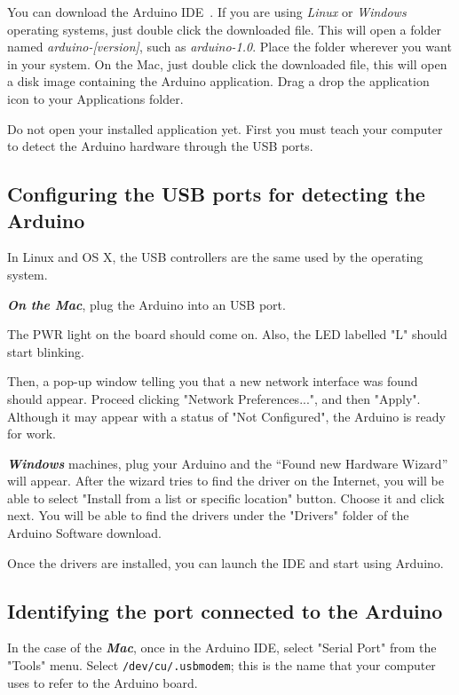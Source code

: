 You can download the Arduino IDE~\emph{}. If you are using \emph{Linux} or \emph{Windows} operating systems, just double click the downloaded file. This will open a folder named \emph{arduino-[version]}, such as \emph{arduino-1.0}. Place the folder wherever you want in your system. On the Mac, just double click the downloaded file, this will open a disk image containing the Arduino application. Drag a drop the application icon to your Applications folder.

Do not open your installed application yet. First you must teach your computer to detect the Arduino hardware through the USB ports.

\subsection{Configuring the USB ports for detecting the Arduino}
In Linux and OS X, the USB controllers are the same used by the operating system.

\emph{\bf{On the Mac}}, plug the Arduino into an USB port.

The PWR light on the board should come on. Also, the LED labelled "L" should start blinking.

Then, a pop-up window telling you that a new network interface was found should appear. Proceed clicking "Network Preferences...", and then "Apply". Although it may appear with a status of "Not Configured", the Arduino is ready for work.

\emph{\bf{Windows}} machines, plug your Arduino and the ``Found new Hardware Wizard'' will appear. After the wizard tries to find the driver on the Internet, you will be able to select "Install from a list or specific location" button. Choose it and click next. You will be able to find the drivers under the "Drivers" folder of the Arduino Software download.

Once the drivers are installed, you can launch the IDE and start using Arduino.

\subsection{Identifying the port connected to the Arduino}
In the case of the \emph{\bf{Mac}}, once in the Arduino IDE, select "Serial Port" from the "Tools" menu. Select \texttt{/dev/cu/.usbmodem}; this is the name that your computer uses to refer to the Arduino board.

